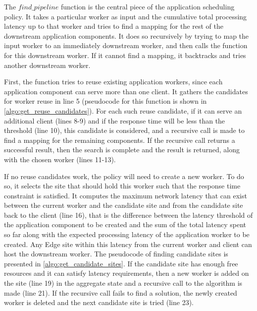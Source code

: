 The $find\_pipeline$ function is the central piece of the application scheduling policy. It takes a particular worker as input and the cumulative total processing latency up to that worker and tries to find a mapping for the rest of the downstream application components. It does so recursively by trying to map the input worker to an immediately downstream worker, and then calls the function for this downstream worker. If it cannot find a mapping, it backtracks and tries another downstream worker.
\par First, the function tries to reuse existing application workers, since each application component can serve more than one client. It gathers the candidates for worker reuse in line 5 (pseudocode for this function is shown in \cref{algo:get_reuse_candidates}). For each such reuse candidate, if it can serve an additional client (lines 8-9) and if the response time will be less than the threshold (line 10), this candidate is considered, and a recursive call is made to find a mapping for the remaining components. If the recursive call returns a successful result, then the search is complete and the result is returned, along with the chosen worker (lines 11-13).
\par If no reuse candidates work, the policy will need to create a new worker. To do so, it selects the site that should hold this worker such that the response time constraint is satisfied. It computes the maximum network latency that can exist between the current worker and the candidate site and from the candidate site back to the client (line 16), that is the difference between the latency threshold of the application component to be created and the sum of the total latency spent so far along with the expected processing latency of the application worker to be created. Any Edge site within this latency from the current worker and client can host the downstream worker. The pseudocode of finding candidate sites is presented in \cref{algo:get_candidate_sites}. If the candidate site has enough free resources and it can satisfy latency requirements, then a new worker is added on the site (line 19) in the aggregate state and a recursive call to the algorithm is made (line 21). If the recursive call fails to find a solution, the newly created worker is deleted and the next candidate site is tried (line 23).

